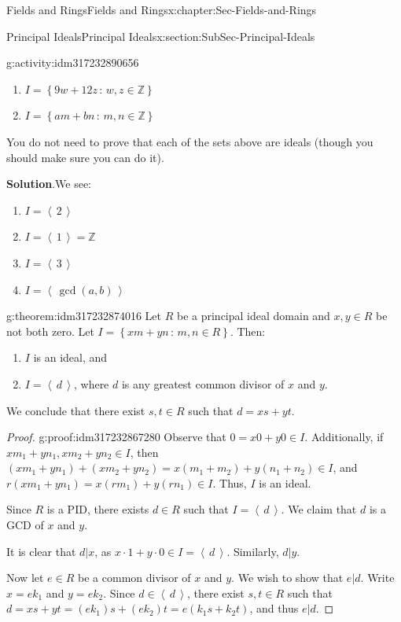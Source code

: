 \documentclass[oneside,10pt,]{book}
\newcommand{\blocktitlefont}{\relax}
\numberwithin{equation}{section}
\newcommand{\ideal}[1]{\left\langle\, #1 \,\right\rangle}
\newcommand{\setof}[2]{{\left\{#1\,\colon\,#2\right\}}}
\def\Z{{\mathbb Z}}
\begin{document}
\begin{chapterptx}{Fields and Rings}{}{Fields and Rings}{}{}{x:chapter:Sec-Fields-and-Rings}
\begin{sectionptx}{Principal Ideals}{}{Principal Ideals}{}{}{x:section:SubSec-Principal-Ideals}
\begin{activity}{}{g:activity:idm317232890656}
\begin{enumerate}
\item{}\(I = \setof{9w+12z}{w,z\in\Z}\)%
\item{}\(I = \setof{am+bn}{m,n\in\Z}\)%
\end{enumerate}
%
\par
You do not need to prove that each of the sets above are ideals (though you should make sure you can do it).%
\par\smallskip%
\noindent\textbf{\blocktitlefont Solution}.\hypertarget{g:solution:idm317232879248}{}\quad{}We see:%
\begin{enumerate}
\item{}\(I= \ideal{2}\)%
\item{}\(I = \ideal{1} = \Z\)%
\item{}\(I = \ideal{3}\)%
\item{}\(I = \ideal{\gcd(a,b)}\)%
\end{enumerate}
%
\end{activity}
\begin{theorem}{}{}{g:theorem:idm317232874016}%
Let \(R\) be a principal ideal domain and \(x,y\in R\) be not both zero. Let \(I = \setof{xm+yn}{m,n\in R}\). Then:%
\begin{enumerate}
\item{}\(I\) is an ideal, and%
\item{}\(I = \ideal{d}\), where \(d\) is any greatest common divisor of \(x\) and \(y\).%
\end{enumerate}
%
\par
We conclude that there exist \(s,t\in R\) such that \(d = xs + yt\).%
\end{theorem}
\begin{proof}{}{g:proof:idm317232867280}
Observe that \(0 = x0 + y0 \in I\). Additionally, if \(x m_1 + y n_1, x m_2 + y n_2\in I\), then \((x m_1 + y n_1) + (x m_2 + y n_2) = x (m_1 + m_2) + y (n_1 + n_2) \in I\), and \(r(x m_1 + y n_1) = x (rm_1) + y(rn_1) \in I\). Thus, \(I\) is an ideal.%
\par
Since \(R\) is a PID, there exists \(d\in R\) such that \(I = \ideal{d}\). We claim that \(d\) is a GCD of \(x\) and \(y\).%
\par
It is clear that \(d|x\), as \(x\cdot 1 + y\cdot 0\in I = \ideal{d}\). Similarly, \(d|y\).%
\par
Now let \(e\in R\) be a common divisor of \(x\) and \(y\). We wish to show that \(e|d\). Write \(x = e k_1\) and \(y = e k_2\). Since \(d\in \ideal{d}\), there exist \(s,t\in R\) such that \(d = x s + yt = (e k_1) s + (e k_2)t = e(k_1 s + k_2 t)\), and thus \(e|d\).%

\end{proof}
\end{sectionptx}
\end{chapterptx}
\end{document}
